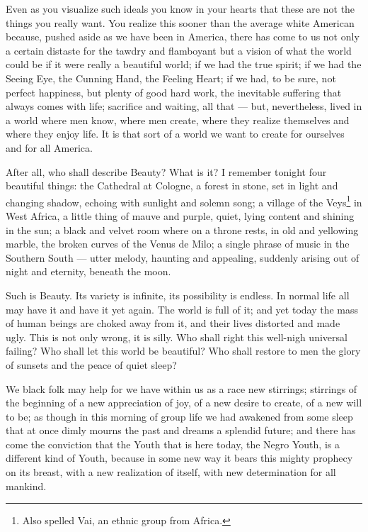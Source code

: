 \documentclass[12pt]{article}
\begin{document}
{\duboispara}%
Even as you visualize such ideals you know in your hearts that these are not the things you really want. You realize this sooner than the average white American because, pushed aside as we have been in America, there has come to us not only a certain distaste for the tawdry and flamboyant but a vision of what the world could be if it were really a beautiful world; if we had the true spirit; if we had the Seeing Eye, the Cunning Hand, the Feeling Heart; if we had, to be sure, not perfect happiness, but plenty of good hard work, the inevitable suffering that always comes with life; sacrifice and waiting, all that --- but, nevertheless, lived in a world where men know, where men create, where they realize themselves and where they enjoy life. It is that sort of a world we want to create for ourselves and for all America. 

{\duboispara}%
After all, who shall describe Beauty? What is it? I remember tonight four beautiful things: the Cathedral at Cologne, a forest in stone, set in light and changing shadow, echoing with sunlight and solemn song; a village of the Veys\footnote{Also spelled Vai, an ethnic group from Africa.} in West Africa, a little thing of mauve and purple, quiet, lying content and shining in the sun; a black and velvet room where on a throne rests, in old and yellowing marble, the broken curves of the Venus de Milo; a single phrase of music in the Southern South --- utter melody, haunting and appealing, suddenly arising out of night and eternity, beneath the moon. 

{\duboispara}%
Such is Beauty. Its variety is infinite, its possibility is endless. In normal life all may have it and have it yet again. The world is full of it; and yet today the mass of human beings are choked away from it, and their lives distorted and made ugly. This is not only wrong, it is silly. Who shall right this well-nigh universal failing? Who shall let this world be beautiful? Who shall restore to men the glory of sunsets and the peace of quiet sleep? 

{\duboispara}%
We black folk may help for we have within us as a race new stirrings; stirrings of the beginning of a new appreciation of joy, of a new desire to create, of a new will to be; as though in this morning of group life we had awakened from some sleep that at once dimly mourns the past and dreams a splendid future; and there has come the conviction that the Youth that is here today, the Negro Youth, is a different kind of Youth, because in some new way it bears this mighty prophecy on its breast, with a new realization of itself, with new determination for all mankind. 
\end{document}
